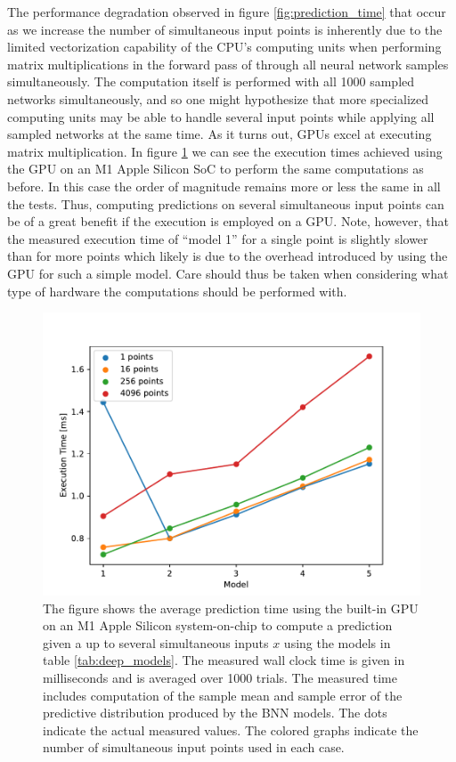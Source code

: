The performance degradation observed in figure \ref{fig:prediction_time} that occur as we increase the number of simultaneous input points is inherently due to the limited vectorization capability of the CPU's computing units when performing matrix multiplications in the forward pass of through all neural network samples simultaneously. The computation itself is performed with all 1000 sampled networks simultaneously, and so one might hypothesize that more specialized computing units may be able to handle several input points while applying all sampled networks at the same time. As it turns out, GPUs excel at executing matrix multiplication. In figure \ref{fig:prediction_time_gpu} we can see the execution times achieved using the GPU on an M1 Apple Silicon SoC to perform the same computations as before. In this case the order of magnitude remains more or less the same in all the tests. Thus, computing predictions on several simultaneous input points can be of a great benefit if the execution is employed on a GPU. Note, however, that the measured execution time of ``model 1'' for a single point is slightly slower than for more points which likely is due to the overhead introduced by using the GPU for such a simple model. Care should thus be taken when considering what type of hardware the computations should be performed with.


\begin{figure}[H]
    \centering
    \includegraphics[scale=0.7]{figures/prediction_time/prediction_time_gpu.pdf}
    \caption{The figure shows the average prediction time using the built-in GPU on an M1 Apple Silicon system-on-chip to compute a prediction given a up to several simultaneous inputs $x$ using the models in table \ref{tab:deep_models}. The measured wall clock time is given in milliseconds and is averaged over 1000 trials. The measured time includes computation of the sample mean and sample error of the predictive distribution produced by the BNN models. The dots indicate the actual measured values. The colored graphs indicate the number of simultaneous input points used in each case.
    }
    \label{fig:prediction_time_gpu}
\end{figure}

